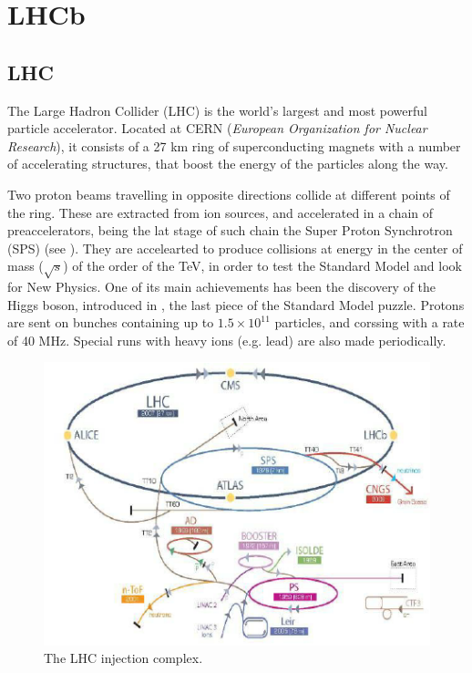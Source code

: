 \chapter{LHCb}
\label{chap:LHCb}

\section{LHC}
\label{sec:LHC}
The Large Hadron Collider (LHC) is the world's largest and most powerful particle accelerator. Located at CERN (\textit{European Organization for Nuclear Research}), it consists of a 27 km ring of superconducting magnets with a number of accelerating structures, that boost the energy of the particles along the way. 

Two proton beams travelling in opposite directions collide at different points of the ring. These are extracted from ion sources, and accelerated in a chain of preaccelerators, being the lat stage of such chain the Super Proton Synchrotron (SPS) (see ). 
They are accelearted to produce collisions at energy in the center of mass ($\sqrt{s}$) of the order of the TeV, in order to test the Standard Model and look for New Physics. One of its main achievements has been the discovery of the Higgs boson, introduced in , the last piece of the Standard Model puzzle. Protons are sent on bunches containing up to $1.5\times 10^{11}$ particles, and corssing with a rate of 40 MHz.  Special runs with heavy ions (e.g. lead) are also made periodically. 
\begin{figure} [htb!]
\begin{center}
\includegraphics[scale=0.5]{figs/lhc.png}
\caption{The LHC injection complex. \label{fig:LHC}}
\end{center}
\end{figure}

